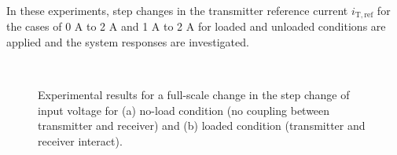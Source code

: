 \documentclass[journal,a4paper,10pt,twoside]{IEEEtran} %
\begin{document}
	 In these experiments, step changes in the transmitter reference current $i_{\mathrm{T,ref}}$ for the cases of 0 A to 2 A and 1 A to 2 A for loaded and unloaded conditions are applied and the system responses are investigated.
	 
	 \begin{figure}
	    \begin{center}
	                \\
	                \vspace{-3mm}
	    \end{center}
	    \vspace{-3mm}
	    \caption{Experimental results for a full-scale change in the step change of input voltage for (a) no-load condition (no coupling between transmitter and receiver) and (b) loaded condition (transmitter and receiver interact).}
	    \label{FIG21}
	    \vspace{-3mm}
	\end{figure}
	 
\end{document}
